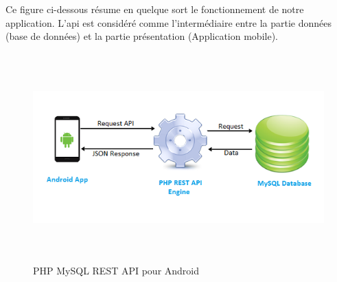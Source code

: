 Ce figure ci-dessous résume en quelque sort le fonctionnement de
notre application.
L’api est considéré comme l’intermédiaire entre la partie données
(base de données) et la partie présentation (Application mobile).
\begin{figure}[h!]
	\includegraphics[width=15cm, height=8cm]{./Template LaTeX/Images/php-mysql-rest-api-for-android.png}
	\caption{PHP MySQL REST API pour Android}
	\label{fig:birds}
\end{figure}
\newline \newline \newline
